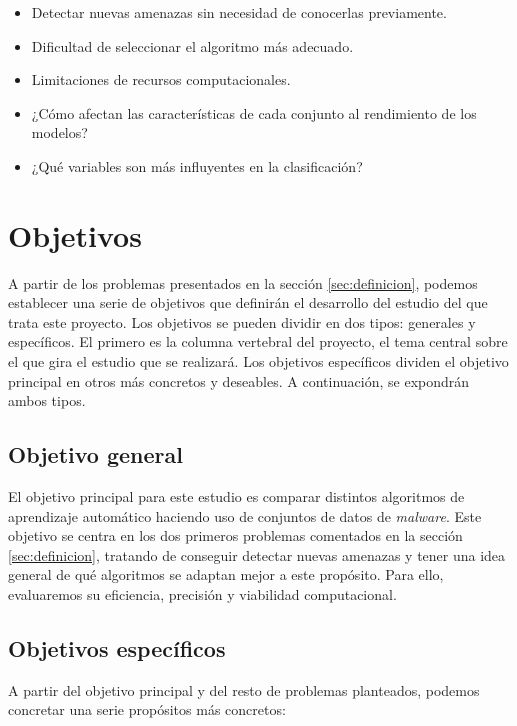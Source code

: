 \begin{itemize}
	\item Detectar nuevas amenazas sin necesidad de conocerlas previamente.
	\item Dificultad de seleccionar el algoritmo más adecuado.
	\item Limitaciones de recursos computacionales.
	\item ¿Cómo afectan las características de cada conjunto al rendimiento de los modelos?
	\item ¿Qué variables son más influyentes en la clasificación?
\end{itemize}

\section{Objetivos}
\label{sec:objetivos}

A partir de los problemas presentados en la sección \ref{sec:definicion}, podemos establecer una serie de objetivos que definirán el desarrollo del estudio del que trata este proyecto. Los objetivos se pueden dividir en dos tipos: generales y específicos. El primero es la columna vertebral del proyecto, el tema central sobre el que gira el estudio que se realizará. Los objetivos específicos dividen el objetivo principal en otros más concretos y deseables. A continuación, se expondrán ambos tipos.

\newpage
\subsection{Objetivo general}
\label{subsec:obj_gen}

El objetivo principal para este estudio es comparar distintos algoritmos de aprendizaje automático haciendo uso de conjuntos de datos de \textit{malware}. Este objetivo se centra en los dos primeros problemas comentados en la sección \ref{sec:definicion}, tratando de conseguir detectar nuevas amenazas y tener una idea general de qué algoritmos se adaptan mejor a este propósito. Para ello, evaluaremos su eficiencia, precisión y viabilidad computacional.

\subsection{Objetivos específicos}
\label{subsec:obj_esp}

A partir del objetivo principal y del resto de problemas planteados, podemos concretar una serie propósitos más concretos:

